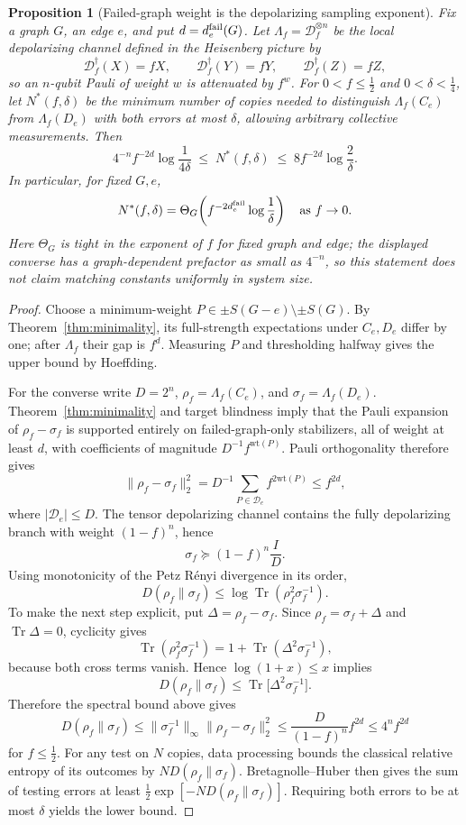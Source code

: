 \documentclass[11pt]{article}
\newtheorem{proposition}[theorem]{Proposition}
\theoremstyle{remark}
\newcommand{\Tr}{\operatorname{Tr}}
\begin{document}
\begin{proposition}[Failed-graph weight is the depolarizing sampling exponent]\label{prop:failweightexponent}
Fix a graph $G$, an edge $e$, and put $d=d_e^{\rm fail}(G)$. Let $\Lambda_f=\mathcal D_f^{\otimes n}$ be the local depolarizing channel defined in the Heisenberg picture by
\[
\mathcal D_f^\dagger(X)=fX,\qquad
\mathcal D_f^\dagger(Y)=fY,\qquad
\mathcal D_f^\dagger(Z)=fZ,
\]
so an $n$-qubit Pauli of weight $w$ is attenuated by $f^w$. For $0<f\le\tfrac12$ and $0<\delta<\tfrac14$, let $N^*(f,\delta)$ be the minimum number of copies needed to distinguish $\Lambda_f(C_e)$ from $\Lambda_f(D_e)$ with both errors at most $\delta$, allowing arbitrary collective measurements. Then
\[
4^{-n} f^{-2d}\log\frac1{4\delta}
\;\le\;
N^*(f,\delta)
\;\le\;
8 f^{-2d}\log\frac2\delta.
\]
In particular, for fixed $G,e$,
\[
N^*(f,\delta)=\Theta_G\!\left(f^{-2d_e^{\rm fail}}\log\frac1\delta\right)
\quad\text{as }f\to0.
\]
Here $\Theta_G$ is tight in the exponent of $f$ for fixed graph and edge; the displayed converse has a graph-dependent prefactor as small as $4^{-n}$, so this statement does not claim matching constants uniformly in system size.
\end{proposition}
\begin{proof}
Choose a minimum-weight $P\in\pm S(G-e)\setminus\pm S(G)$. By Theorem~\ref{thm:minimality}, its full-strength expectations under $C_e,D_e$ differ by one; after $\Lambda_f$ their gap is $f^d$. Measuring $P$ and thresholding halfway gives the upper bound by Hoeffding.

For the converse write $D=2^n$, $\rho_f=\Lambda_f(C_e)$, and $\sigma_f=\Lambda_f(D_e)$. Theorem~\ref{thm:minimality} and target blindness imply that the Pauli expansion of $\rho_f-\sigma_f$ is supported entirely on failed-graph-only stabilizers, all of weight at least $d$, with coefficients of magnitude $D^{-1}f^{\mathrm{wt}(P)}$. Pauli orthogonality therefore gives
\[
\|\rho_f-\sigma_f\|_2^2
=D^{-1}\sum_{P\in\mathcal D_e}f^{2\mathrm{wt}(P)}
\le f^{2d},
\]
where $|\mathcal D_e|\le D$. The tensor depolarizing channel contains the fully depolarizing branch with weight $(1-f)^n$, hence
\[
\sigma_f\succeq (1-f)^n\frac{I}{D}.
\]
Using monotonicity of the Petz R\'enyi divergence in its order,
\[
D(\rho_f\|\sigma_f)
\le \log\Tr(\rho_f^2\sigma_f^{-1}).
\]
To make the next step explicit, put $\Delta=\rho_f-\sigma_f$. Since $\rho_f=\sigma_f+\Delta$ and $\Tr\Delta=0$, cyclicity gives
\[
\Tr(\rho_f^2\sigma_f^{-1})
=1+\Tr(\Delta^2\sigma_f^{-1}),
\]
because both cross terms vanish. Hence $\log(1+x)\le x$ implies
\[
D(\rho_f\|\sigma_f)
\le \Tr\!\big[\Delta^2\sigma_f^{-1}\big].
\]
Therefore the spectral bound above gives
\[
D(\rho_f\|\sigma_f)
\le \|\sigma_f^{-1}\|_\infty\|\rho_f-\sigma_f\|_2^2
\le \frac{D}{(1-f)^n}f^{2d}
\le 4^n f^{2d}
\]
for $f\le\tfrac12$. For any test on $N$ copies, data processing bounds the classical relative entropy of its outcomes by $N D(\rho_f\|\sigma_f)$. Bretagnolle--Huber then gives the sum of testing errors at least $\tfrac12\exp[-N D(\rho_f\|\sigma_f)]$. Requiring both errors to be at most $\delta$ yields the lower bound.
\end{proof}
\end{document}
